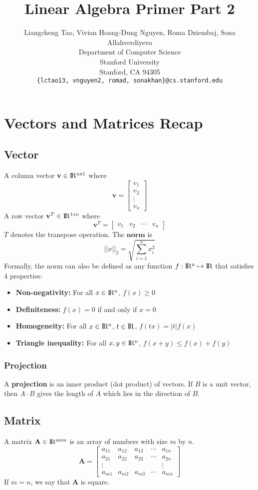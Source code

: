 \documentclass{article}
\title{Linear Algebra Primer Part 2}
\author{
  Liangcheng Tao, Vivian Hoang-Dung Nguyen, Roma Dziembaj, Sona Allahverdiyeva \\
  Department of Computer Science\\
  Stanford University\\
  Stanford, CA 94305 \\
  \texttt{\{lctao13, vnguyen2, romad, sonakhan\}@cs.stanford.edu} \\
}
\begin{document}
\maketitle

\section{Vectors and Matrices Recap}
\subsection{Vector}
A column vector $\textbf{v} \in {\rm I\!R^{nx1}}$ where $$ \textbf{v} = \begin{bmatrix}
    v_1 \\
    v_2 \\ 
    \vdots \\
    v_n
  \end{bmatrix}
 $$
\newline
A row vector $\textbf{v}^T \in {\rm I\!R^{1xn}}$ where $$ \textbf{v}^T = \begin{bmatrix}
    v_1 & v_2 & \cdots & v_n
  \end{bmatrix}
 $$
\newline
$T$ denotes the transpose operation.
\newline
\newline 
The $\textbf{norm}$ is $$||x||_2 = \sqrt{\sum_{i=1}^{n} x_i^2}$$
Formally, the norm can also be defined as any function $f:{\rm I\!R^{n}} \mapsto {\rm I\!R}$ that satisfies 4 properties:
\begin{itemize}
\item \textbf{Non-negativity:} For all $x \in {\rm I\!R^{n}}$, $f(x) \geq 0$
\item \textbf{Definiteness:} $f(x) = 0$ if and only if $x = 0$
\item \textbf{Homogeneity:} For all $x \in {\rm I\!R^{n}}$, $t \in {\rm I\!R}$, $f(tx) = |t|f(x)$
\item \textbf{Triangle inequality:} For all $x,y \in {\rm I\!R^{n}}$, $f(x+y) \leq f(x) + f(y)$
\end{itemize}
\subsubsection{Projection}
A \textbf{projection} is an inner product (dot product) of vectors. If $B$ is a unit vector, then $A \cdot B$ gives the length of $A$ which lies in the direction of $B$.
\subsection{Matrix}
A matrix $\textbf{A} \in {\rm I\!R^{mxn}}$ is an array of numbers with size $m$ by $n$.
$$ \textbf{A} = \begin{bmatrix}
    a_{11} & a_{12} & a_{13} & \cdots & a_{1n} \\
    a_{21} & a_{22} & a_{23} & \cdots & a_{2n} \\ 
    \vdots & & & & \vdots \\
    a_{m1} & a_{m2} & a_{m3} & \cdots & a_{mn}
  \end{bmatrix}
$$
\newline
If $m=n$, we say that $\textbf{A}$ is square.
\end{document}
